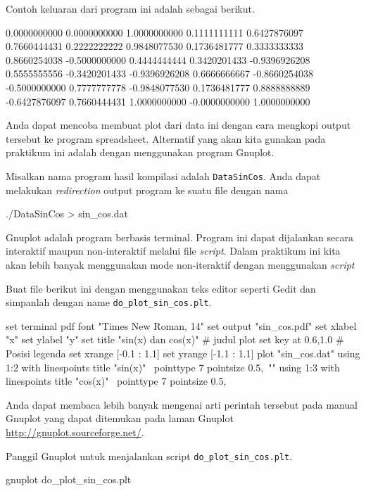 \documentclass[a4paper,11pt]{extarticle}
\begin{document}
Contoh keluaran dari program ini adalah sebagai berikut.
\begin{textcode}
      0.0000000000       0.0000000000       1.0000000000
      0.1111111111       0.6427876097       0.7660444431
      0.2222222222       0.9848077530       0.1736481777
      0.3333333333       0.8660254038      -0.5000000000
      0.4444444444       0.3420201433      -0.9396926208
      0.5555555556      -0.3420201433      -0.9396926208
      0.6666666667      -0.8660254038      -0.5000000000
      0.7777777778      -0.9848077530       0.1736481777
      0.8888888889      -0.6427876097       0.7660444431
      1.0000000000      -0.0000000000       1.0000000000
\end{textcode}

Anda dapat mencoba membuat plot dari data ini dengan cara mengkopi output tersebut
ke program spreadsheet.
Alternatif yang akan kita gunakan pada praktikum ini adalah dengan menggunakan
program \textsf{Gnuplot}.

Misalkan nama program hasil kompilasi adalah \texttt{DataSinCos}.
Anda dapat melakukan \textit{redirection} output program ke suatu file
dengan nama
\begin{textcode}
./DataSinCos > sin_cos.dat
\end{textcode}

\textsf{Gnuplot} adalah program berbasis terminal. Program ini dapat dijalankan
secara interaktif maupun non-interaktif melalui file \textit{script}.
Dalam praktikum ini kita
akan lebih banyak menggunakan mode non-iteraktif dengan menggunakan \textit{script}

Buat file berikut ini dengan menggunakan teks editor seperti \textsf{Gedit}
dan simpanlah dengan name \texttt{do\_plot\_sin\_cos.plt}.
\begin{gnuplotcode}
set terminal pdf font "Times New Roman, 14"
set output "sin_cos.pdf"
set xlabel "x"
set ylabel "y"
set title "sin(x) dan cos(x)" # judul plot
set key at 0.6,1.0 # Posisi legenda
set xrange [-0.1 : 1.1]
set yrange [-1.1 : 1.1]
plot "sin_cos.dat" using 1:2 with linespoints title "sin(x)" \
                   pointtype 7 pointsize 0.5,\
                "" using 1:3 with linespoints title "cos(x)" \
                   pointtype 7 pointsize 0.5,
\end{gnuplotcode}
Anda dapat membaca lebih banyak mengenai arti perintah tersebut pada
manual \textsf{Gnuplot} yang dapat ditemukan pada laman
\textsf{Gnuplot} \url{http://gnuplot.sourceforge.net/}.

Panggil \textsf{Gnuplot} untuk menjalankan script \texttt{do\_plot\_sin\_cos.plt}.
\begin{textcode}
gnuplot do_plot_sin_cos.plt
\end{textcode}
\end{document}

